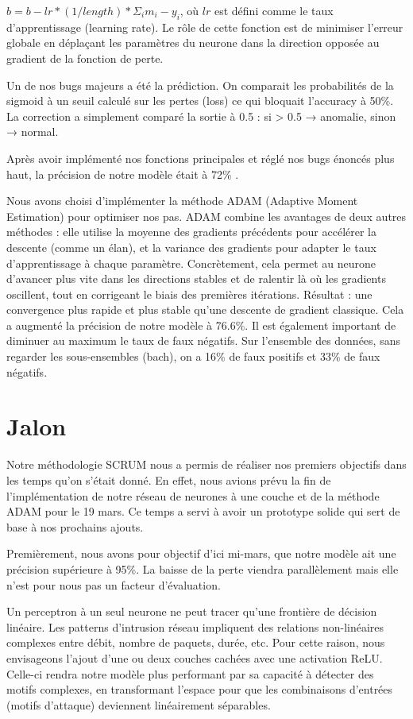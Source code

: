 \documentclass{article}
\begin{document}
\(b=b-lr*(1/length) * \Sigma_i m_i - y_i \),  où $lr$ est défini comme le taux d'apprentissage (learning rate). Le rôle de cette fonction est de minimiser
l'erreur globale en déplaçant les paramètres du neurone dans la direction opposée au gradient de la fonction de perte.

Un de nos bugs majeurs a été la prédiction. On comparait les probabilités de la sigmoid à un seuil calculé sur les pertes (loss) ce qui bloquait l'accuracy 
à 50\%. La correction a simplement comparé la sortie à 0.5 : si > 0.5 → anomalie, sinon → normal.

Après avoir implémenté nos fonctions principales et réglé nos bugs énoncés plus haut, la précision de notre modèle était à 72\% .

Nous avons choisi d'implémenter la méthode ADAM (Adaptive Moment Estimation) pour optimiser nos pas. ADAM combine les avantages de deux autres méthodes : 
elle utilise la moyenne des gradients précédents pour accélérer la descente (comme un élan), et la variance des gradients pour adapter le taux d'apprentissage
à chaque paramètre. Concrètement, cela permet au neurone d'avancer plus vite dans les directions stables et de ralentir là où les gradients oscillent, tout en
corrigeant le biais des premières itérations. Résultat : une convergence plus rapide et plus stable qu'une descente de gradient classique. Cela a augmenté la 
précision de notre modèle à 76.6\%.
Il est également important de diminuer au maximum le taux de faux négatifs. Sur l’ensemble des données, sans regarder les sous-ensembles (bach), on a 16\% de
faux positifs et 33\% de faux négatifs.


\section{Jalon}

Notre méthodologie SCRUM nous a permis de réaliser nos premiers objectifs dans les temps qu’on s’était donné. En effet, nous avions prévu la fin de l’implémentation
de notre réseau de neurones à une couche et de la méthode ADAM pour le 19 mars. Ce temps a servi à avoir un prototype solide qui sert de base à nos prochains ajouts.

Premièrement, nous avons pour objectif d’ici mi-mars, que notre modèle ait une précision supérieure à 95\%. La baisse de la perte viendra parallèlement mais elle
n’est pour nous pas un facteur d’évaluation.  

Un perceptron à un seul neurone ne peut tracer qu'une frontière de décision linéaire. Les patterns d'intrusion réseau impliquent des relations non-linéaires 
complexes entre débit, nombre de paquets, durée, etc. Pour cette raison, nous envisageons l’ajout d’une ou deux couches cachées avec une activation ReLU. Celle-ci
rendra notre modèle plus performant par sa capacité à détecter des motifs complexes, en transformant l’espace pour que les combinaisons d’entrées (motifs d'attaque)
deviennent linéairement séparables. 
\end{document}
